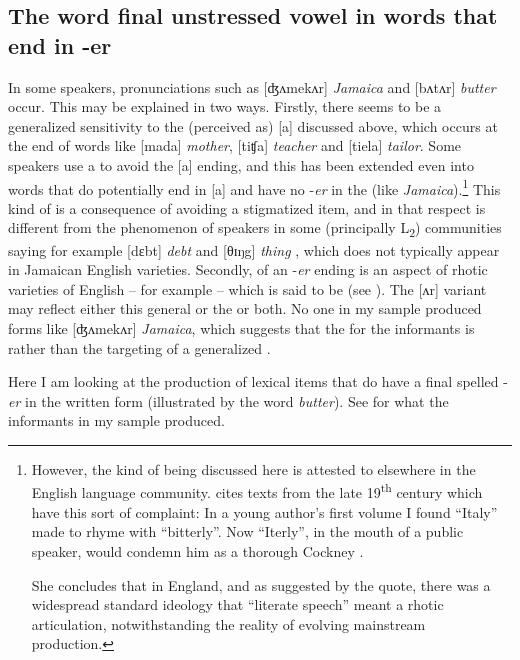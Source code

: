 \subsection{{The} {word} {final} {unstressed} {vowel} {in} {words} {that} {end} {in} {-er}}%
In some speakers, pronunciations such as [ʤʌmekʌr] \textit{Jamaica} and [bʌtʌr] \textit{butter} occur.  This may be explained in two ways.  Firstly, there seems to be a generalized sensitivity to the (perceived as)  [a] discussed above, which occurs at the end of words like [mada] \textit{mother}, [tiʧa] \textit{teacher} and [tiela] \textit{tailor}.  Some speakers use a  to avoid the [a] ending, and this has been extended even into words that do potentially end in [a] and have no -\textit{er} in the  (like \textit{Jamaica}).\footnote{However, the kind of  being discussed here is attested to elsewhere in the English language community.  \citet[100]{Mugglestone1995} cites texts from the late 19\textsuperscript{th} century which have this sort of complaint: In a young author’s first volume I found “Italy” made to rhyme with “bitterly”.  Now “Iterly”, in the mouth of a public speaker, would condemn him as a thorough Cockney \citep{Carpenter1868}.

She concludes that in England, and as suggested by the quote, there was a widespread standard ideology that “literate speech” meant a rhotic articulation, notwithstanding the reality of evolving mainstream  production.}   This kind of  is a consequence of avoiding a stigmatized item, and in that respect is different from the phenomenon of speakers in some (principally L\textsubscript{2}) communities saying for example [dɛbt] \textit{debt} and [θɪŋg] \textit{thing} \citep[123]{ Trudgill1994}, which does not typically appear in Jamaican English varieties.  Secondly,  of an -\textit{er} ending is an aspect of rhotic varieties of English – for example  \citep[64f]{Giegerich1992} – which  is said to be (see ).  The [ʌr] variant may reflect either this general  or the    or both.  No one in my sample produced forms like [ʤʌmekʌr] \textit{Jamaica}, which suggests that the  for the  informants is  rather than the targeting of a generalized .   

Here I am looking at the production of lexical items that do have a final spelled -\textit{er} in the written form (illustrated by the word \textit{butter}). See  for what the informants in my sample produced.  

